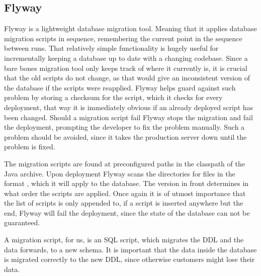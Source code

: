 \subsection{Flyway}\label{subsubsec:flyway}
Flyway is a lightweight database migration tool.
Meaning that it applies database migration scripts in sequence, remembering the current point in the sequence between runs.
That relatively simple functionality is hugely useful for incrementally keeping a database up to date with a changing codebase.
Since a bare bones migration tool only keeps track of where it currently is, it is crucial that the old scripts do not change, as that would give an inconsistent version of the database if the scripts were reapplied.
Flyway helps guard against such problem by storing a checksum for the script, which it checks for every deployment, that way it is immediately obvious if an already deployed script has been changed.
Should a migration script fail Flyway stops the migration and fail the deployment, prompting the developer to fix the problem manually.
Such a problem should be avoided, since it takes the production server down until the problem is fixed.

The migration scripts are found at preconfigured paths in the classpath of the Java archive.
Upon deployment Flyway scans the directories for files in the format , which it will apply to the database.
The version in front determines in what order the scripts are applied.
Once again it is of utmost importance that the list of scripts is only appended to, if a script is inserted anywhere but the end, Flyway will fail the deployment, since the state of the database can not be guaranteed.

A migration script, for us, is an SQL script, which migrates the \ac{DDL} and the data forwards, to a new schema.
It is important that the data inside the database is migrated correctly to the new \ac{DDL}, since otherwise customers might lose their data.
